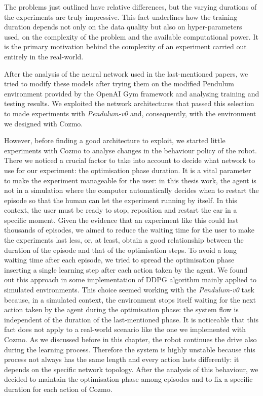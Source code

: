 The problems just outlined have relative differences, but the varying durations of the experiments are truly impressive.
This fact underlines how the training duration depends not only on the data quality but also on hyper-parameters used, on the complexity of the problem and the available computational power.
It is the primary motivation behind the complexity of an experiment carried out entirely in the real-world.

After the analysis of the neural network used in the last-mentioned papers, we tried to modify these models after trying them on the modified Pendulum environment provided by the OpenAI Gym framework and analysing training and testing results.
We exploited the network architectures that passed this selection to made experiments with \textit{Pendulum-v0} and, consequently, with the environment we designed with Cozmo.

However, before finding a good architecture to exploit, we started little experiments with Cozmo to analyse changes in the behaviour policy of the robot.
There we noticed a crucial factor to take into account to decide what network to use for our experiment: the optimisation phase duration.
It is a vital parameter to make the experiment manageable for the user: in this thesis work, the agent is not in a simulation where the computer automatically decides when to restart the episode so that the human can let the experiment running by itself.
In this context, the user must be ready to stop, reposition and restart the car in a specific moment.
Given the evidence that an experiment like this could last thousands of episodes, we aimed to reduce the waiting time for the user to make the experiments last less, or, at least, obtain a good relationship between the duration of the episode and that of the optimisation steps.
To avoid a long waiting time after each episode, we tried to spread the optimisation phase inserting a single learning step after each action taken by the agent. We found out this approach in some implementation of DDPG algorithm mainly applied to simulated environments. This choice seemed working with the \textit{Pendulum-v0} task because, in a simulated context, the environment stops itself waiting for the next action taken by the agent during the optimisation phase: the system flow is independent of the duration of the last-mentioned phase.
It is noticeable that this fact does not apply to a real-world scenario like the one we implemented with Cozmo. As we discussed before in this chapter, the robot continues the drive also during the learning process.
Therefore the system is highly unstable because this process not always has the same length and every action lasts differently: it depends on the specific network topology.
After the analysis of this behaviour, we decided to maintain the optimisation phase among episodes and to fix a specific duration for each action of Cozmo.

